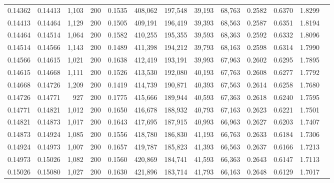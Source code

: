 \begin{tabular}{rrrrrrrrrrrrr}
0.14362 & 0.14413 & 1,103 & 200 &                                     0.1535 & 408,062 & 197,548 &  39,193 &  68,763 & 0.2582 & 0.6370 & 1.8299 \\
0.14413 & 0.14464 & 1,129 & 200 &                                     0.1505 & 409,191 & 196,419 &  39,393 &  68,563 & 0.2587 & 0.6351 & 1.8194 \\
0.14464 & 0.14514 & 1,064 & 200 &                                     0.1582 & 410,255 & 195,355 &  39,593 &  68,363 & 0.2592 & 0.6332 & 1.8096 \\
0.14514 & 0.14566 & 1,143 & 200 &                                     0.1489 & 411,398 & 194,212 &  39,793 &  68,163 & 0.2598 & 0.6314 & 1.7990 \\
0.14566 & 0.14615 & 1,021 & 200 &                                     0.1638 & 412,419 & 193,191 &  39,993 &  67,963 & 0.2602 & 0.6295 & 1.7895 \\
0.14615 & 0.14668 & 1,111 & 200 &                                     0.1526 & 413,530 & 192,080 &  40,193 &  67,763 & 0.2608 & 0.6277 & 1.7792 \\
0.14668 & 0.14726 & 1,209 & 200 &                                     0.1419 & 414,739 & 190,871 &  40,393 &  67,563 & 0.2614 & 0.6258 & 1.7680 \\
0.14726 & 0.14771 &   927 & 200 &                                     0.1775 & 415,666 & 189,944 &  40,593 &  67,363 & 0.2618 & 0.6240 & 1.7595 \\
0.14771 & 0.14821 & 1,012 & 200 &                                     0.1650 & 416,678 & 188,932 &  40,793 &  67,163 & 0.2623 & 0.6221 & 1.7501 \\
0.14821 & 0.14873 & 1,017 & 200 &                                     0.1643 & 417,695 & 187,915 &  40,993 &  66,963 & 0.2627 & 0.6203 & 1.7407 \\
0.14873 & 0.14924 & 1,085 & 200 &                                     0.1556 & 418,780 & 186,830 &  41,193 &  66,763 & 0.2633 & 0.6184 & 1.7306 \\
0.14924 & 0.14973 & 1,007 & 200 &                                     0.1657 & 419,787 & 185,823 &  41,393 &  66,563 & 0.2637 & 0.6166 & 1.7213 \\
0.14973 & 0.15026 & 1,082 & 200 &                                     0.1560 & 420,869 & 184,741 &  41,593 &  66,363 & 0.2643 & 0.6147 & 1.7113 \\
0.15026 & 0.15080 & 1,027 & 200 &                                     0.1630 & 421,896 & 183,714 &  41,793 &  66,163 & 0.2648 & 0.6129 & 1.7017 \\

\end{tabular}
